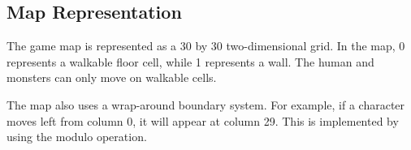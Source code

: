 \subsection{Map Representation}

The game map is represented as a 30 by 30 two-dimensional grid. In the map, 0 represents a walkable floor cell, while 1 represents a wall. The human and monsters can only move on walkable cells.

The map also uses a wrap-around boundary system. For example, if a character moves left from column 0, it will appear at column 29. This is implemented by using the modulo operation.
